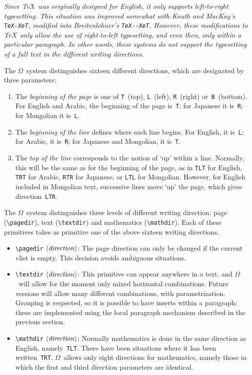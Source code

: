 \documentclass[fleqn]{article}
\newcommand{\OMEGA}{$\Omega$}
\newcommand{\showdir}{\langle\mbox{\emph{direction}}\rangle}
\begin{document}
\bigskip

{\em 
Since \TeX\ was originally designed for English, it only supports
left-to-right typesetting.  This situation was improved somewhat
with Knuth and MacKay's \verb|TeX-XeT|, modified into Breitenlohner's
\verb|TeX--XeT|.  However, these modifications to \TeX\ only
allow the use of right-to-left typesetting, and even then, only
within a particular paragraph.  In other words, these systems do
not support the typesetting of a full text in the different writing
directions.

The \OMEGA\ system distinguishes sixteen different directions,
which are designated by three parameters:
\begin{enumerate}
\item The \emph{beginning of the page} is one of \texttt{T}~(top),
\texttt{L}~(left), \texttt{R}~(right) or~\texttt{B}~(bottom).
For English and Arabic, the beginning of the page is~\texttt{T};
for Japanese it is~\texttt{R}; for Mongolian it is~\texttt{L}.
\item The \emph{beginning of the line} defines where each line begins.
For English, it is~\texttt{L}; for Arabic, it is~\texttt{R}; for Japanese
and Mongolian, it is~\texttt{T}.
\item The \emph{top of the line} corresponds to the notion
of `up' within a line.  Normally, this will be the same as for the
beginning of the page, as in \texttt{TLT} for English, \texttt{TRT}
for Arabic, \texttt{RTR} for Japanese, or \texttt{LTL} for Mongolian.
However, for English included in Mongolian text, successive lines
move `up' the page, which gives direction~\texttt{LTR}.
\end{enumerate}

The \OMEGA\ system distinguishes three levels of different writing
direction: page (\verb|\pagedir|), text (\verb|\textdir|) and
mathematics (\verb|\mathdir|).  Each of these primitives takes
as primitive one of the above sixteen writing directions.
\begin{itemize}
\item \verb|\pagedir| $\showdir$:\quad
The page direction can only be changed if the current vlist
is empty.  This decision avoids ambiguous situations.
\item \verb|\textdir| $\showdir$:\quad
This primitive can appear anywhere in a text, and \OMEGA\ will
allow for the moment only mixed horizontal combinations.
Future versions will allow many different combinations, with
parametrization.
Grouping is respected, so it is possible to have inserts
within a paragraph:  these are implemented using the local paragraph
mechanism described in the previous section.
\item \verb|\mathdir| $\showdir$:\quad
Normally mathematics is done in the same direction as English,
namely~\texttt{TLT}.  There have been situations where it has been
written~\texttt{TRT}.  \OMEGA\ allows only eight directions for
mathematics, namely those in which
the first and third direction parameters are identical.
\end{itemize}

}
\end{document}
